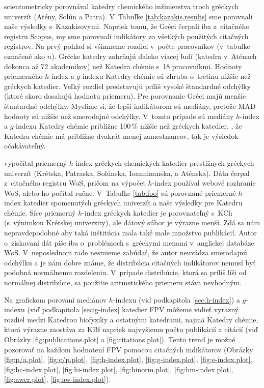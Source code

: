\citet{Kazakis2015} scientometricky porovnával katedry chemického inžinierstva
troch gréckych univerzít (Atény, Solún a Patra).  V~Tabuľke
\ref{tab:kazakis.results} sme porovnali naše výsledky s~Kazakisovymi. Napriek
tomu, že Gréci čerpali iba z~citačného registru Scopus, my sme porovnali
indikátory zo všetkých použitých citačných registrov. Na prvý pohľad si
všimneme rozdiel v~počte pracovníkov (v~tabuľke označené ako $n$).  Grécke
katedry zahrňujú ďaleko viacej ľudí (katedra v~Aténach dokonca až 72
akademikov) než Katedra chémie s~18 pracovníkmi.  Hodnoty priemerného $h$-index
a $g$-indexu Katedry chémie sú  zhruba o~tretinu nižšie než gréckych katedier.
Veľký rozdiel predstavujú príliš vysoké štandardné odchýlky (ktoré skoro
dosahujú hodnotu priemeru). Pre porovnanie Gréci majú menšie štantardné odchýlky.  Myslíme si, že lepší
indikátorom sú mediány, pretože MAD hodnoty sú nižšie než smerodajné odchýlky.
V~tomto prípade sú mediány $h$-index a $g$-indexu Katedry chémie približne 100\,\%
nižšie než gréckych katedier. , že Katedra chémie má
približne dvakrát menej zamestnancov, tak je výsledok očakávateľný.

\citet{Lazaridis2010} vypočítal priemerný $h$-index gréckych chemických
katedier prestížnych gréckych univerzít (Krétska, Patraska, Solúnska,
Ioanninanska, a Aténska).  Dáta čerpal z~citačného registru WoS, pričom na
výpočet $h$-index používal webové rozhranie WoS, alebo ho počítal ručne. 
V~Tabuľke \ref{tab:foo} sú porovnané priemerné $h$-index katedier
spomenutých gréckych univerzít a naše výsledky pre Katedru chémie. Síce
priemerný $h$-index gréckych katedier je porovnateľný s~KCh (s~výnimkou
Krétskej univerzity), ale dátový súbor je výrazne menší. Zdá sa nám
nepravdepodobné aby taká inštitúcia mala také male množstvo publikácií.  Autor
o~získavaní dát píše iba o~problémoch s~gréckymi menami v~anglickej databáze
WoS. V~neposlednom rade nesmieme zabúdať, že autor neuvádza smerodajnú odchýlku
a je nám dobre známe, že distribúcia citačných indikátorov nemusí byť podobná
normálnemu rozdeleniu. V~prípade distribúcie, ktorá sa príliš líši od normálnej 
distribúcie, sa použitie aritmetického priemeru stáva nevhodným.

Na grafickom porovaní mediánov $h$-indexu (viď podkapitola \ref{sec:h-index}) a
$g$-indexu (viď podkapitola \ref{sec:g-index} katedier FPV môžeme vidieť vyrazný
rozdiel medzi Katedrou biofyziky a ostatnými katedrami, najmä Katedry chémie,
ktorá výrazne zaostáva za KBf napriek najvyšiemu počtu publikácií a citácií
(viď Obrázky \ref{fig:publications.plot} a \ref{fig:citations.plot}).  Tento
trend je možné pozorovať na každom hodnotení FPV pomocou citačných indikátorov
(Obrázky \ref{fig:p/a.plot}, \ref{fig:c/p.plot}, \ref{fig:h-index.plot},
\ref{fig:g-index.plot}, \ref{fig:e-index.plot}, \ref{fig:hc-index.plot}, \ref{fig:hi-index.plot},
\ref{fig:hinorm.plot}, \ref{fig:hm-index.plot}, \ref{fig:awcr.plot}, \ref{fig:aw-index.plot}).

